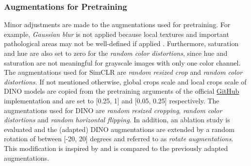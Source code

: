 \subsubsection{Augmentations for Pretraining}
\label{section: augmentations for pretraining}
Minor adjustments are made to the augmentations used for pretraining.
For example, \textit{Gaussian blur} is not applied because local textures and important pathological areas may not be well-defined if applied \citep{Azizi2021}.
Furthermore, saturation and hue are also set to zero for the \textit{random color distortions}, since hue and saturation are not meaningful for grayscale images with only one color channel.
The augmentations used for SimCLR are \textit{random resized crop} and \textit{random color distortions}.
If not mentioned otherwise, global crops scale and local crops scale of DINO models are copied from the pretraining arguments of the official \href{https://github.com/facebookresearch/dino#pretrained-models}{GitHub} implementation and are set to [0.25, 1] and [0.05, 0.25] respectively. 
The augmentations used for DINO are \textit{random resized cropping}, \textit{random color distortions} and \textit{random horizontal flipping}.
In addition, an ablation study is evaluated and the (adapted) DINO augmentations are extended by a random rotation of between [-20, 20] degrees and referred to as \textit{rotate augmentations}. 
This modification is inspired by \citep{Azizi2021} and is compared to the previously adapted augmentations.
\par
